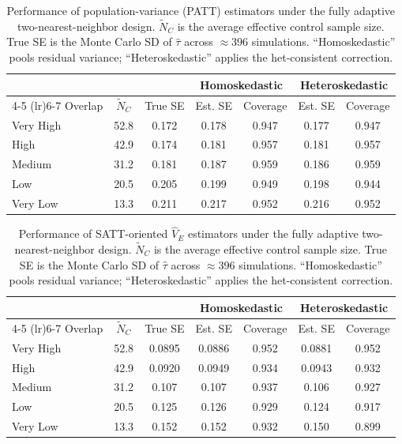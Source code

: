 \documentclass[11pt]{article}
\begin{document}
\begin{table}[hbt!]
\centering
\begin{tabular}{lcccccc}
  \hline
  & & & \multicolumn{2}{c}{Homoskedastic} & \multicolumn{2}{c}{Heteroskedastic} \\
  \cmidrule(lr){4-5} \cmidrule(lr){6-7}
  Overlap & $\tilde{N}_C$ & True SE & Est. SE & Coverage & Est. SE & Coverage \\
  \hline
  Very High & 52.8 & 0.172 & 0.178 & 0.947 & 0.177 & 0.947 \\
  High      & 42.9 & 0.174 & 0.181 & 0.957 & 0.181 & 0.957 \\
  Medium    & 31.2 & 0.181 & 0.187 & 0.959 & 0.186 & 0.959 \\
  Low       & 20.5 & 0.205 & 0.199 & 0.949 & 0.198 & 0.944 \\
  Very Low  & 13.3 & 0.211 & 0.217 & 0.952 & 0.216 & 0.952 \\
  \hline
\end{tabular}
\caption{Performance of population-variance (PATT) estimators under the fully adaptive two-nearest-neighbor design. $\tilde{N}_C$ is the average effective control sample size. True SE is the Monte Carlo SD of $\hat{\tau}$ across $\approx 396$ simulations. ``Homoskedastic'' pools residual variance; ``Heteroskedastic'' applies the het-consistent correction.}
\label{tab:toy_var_pooled_vs_het_2nn}
\end{table}

\begin{table}[hbt!]
\centering
\begin{tabular}{lcccccc}
  \hline
  & & & \multicolumn{2}{c}{Homoskedastic} & \multicolumn{2}{c}{Heteroskedastic} \\
  \cmidrule(lr){4-5} \cmidrule(lr){6-7}
  Overlap & $\tilde{N}_C$ & True SE & Est. SE & Coverage & Est. SE & Coverage \\
  \hline
  Very High & 52.8 & 0.0895 & 0.0886 & 0.952 & 0.0881 & 0.952 \\
  High      & 42.9 & 0.0920 & 0.0949 & 0.934 & 0.0943 & 0.932 \\
  Medium    & 31.2 & 0.107  & 0.107  & 0.937 & 0.106  & 0.927 \\
  Low       & 20.5 & 0.125  & 0.126  & 0.929 & 0.124  & 0.917 \\
  Very Low  & 13.3 & 0.152  & 0.152  & 0.932 & 0.150  & 0.899 \\
  \hline
\end{tabular}
\caption{Performance of SATT-oriented $\hat{V}_E$ estimators under the fully adaptive two-nearest-neighbor design. $\tilde{N}_C$ is the average effective control sample size. True SE is the Monte Carlo SD of $\hat{\tau}$ across $\approx 396$ simulations. ``Homoskedastic'' pools residual variance; ``Heteroskedastic'' applies the het-consistent correction.}
\label{tab:toy_var_pooled_vs_het_VE_2nn}
\end{table}
\end{document}
